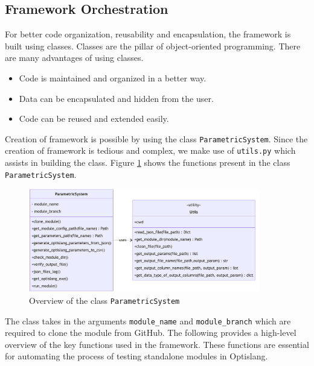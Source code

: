 \subsection{Framework Orchestration} \label{parametric_system_code}
For better code organization, reusability and encapsulation, the framework is built using classes. Classes are the pillar of object-oriented programming.
There are many advantages of using classes.
\begin{itemize}
  \item Code is maintained and organized in a better way.
  \item Data can be encapsulated and hidden from the user.
  \item Code can be reused and extended easily.
\end{itemize}
Creation of framework is possible by using the class \texttt{ParametricSystem}. Since the creation of framework is tedious and complex, we make use of 
\texttt{utils.py} which assists in building the class. Figure \ref{parametric_system_class} shows the functions present in the class \texttt{ParametricSystem}.
\begin{figure}[!ht]
  \centering
  \includegraphics[width=0.9\textwidth]{Images/parametric_system_class.pdf}
  \caption{Overview of the class \texttt{ParametricSystem}}
  \label{parametric_system_class}
\end{figure}

The class takes in the arguments \texttt{module\_name} and \texttt{module\_branch} which are required to clone the module from GitHub. 
The following provides a high-level overview of the key functions used in the framework. These functions are essential for automating the process of testing 
standalone modules in Optislang.

